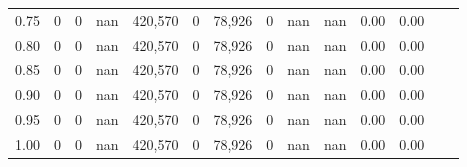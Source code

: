 \begin{tabular}{rrrrrrrrrrrrrr}
0.75 &       0 &       0 &     nan &  420,570 &        0 &  78,926 &       0 &   nan &   nan &  0.00 &      0.00 \\
0.80 &       0 &       0 &     nan &  420,570 &        0 &  78,926 &       0 &   nan &   nan &  0.00 &      0.00 \\
0.85 &       0 &       0 &     nan &  420,570 &        0 &  78,926 &       0 &   nan &   nan &  0.00 &      0.00 \\
0.90 &       0 &       0 &     nan &  420,570 &        0 &  78,926 &       0 &   nan &   nan &  0.00 &      0.00 \\
0.95 &       0 &       0 &     nan &  420,570 &        0 &  78,926 &       0 &   nan &   nan &  0.00 &      0.00 \\
1.00 &       0 &       0 &     nan &  420,570 &        0 &  78,926 &       0 &   nan &   nan &  0.00 &      0.00 \\
\bottomrule
\end{tabular}
